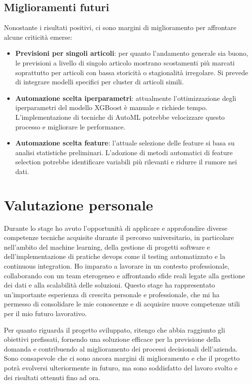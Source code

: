 \subsection{Miglioramenti futuri}
Nonostante i risultati positivi, ci sono margini di miglioramento per affrontare alcune criticità emerse:
\begin{itemize}
\item \textbf{Previsioni per singoli articoli}: per quanto l'andamento generale sia buono, le previsioni a livello di singolo articolo mostrano scostamenti più marcati soprattutto per articoli con bassa storicità o stagionalità irregolare. Si prevede di integrare modelli specifici per cluster di articoli simili.
    \item \textbf{Automazione scelta iperparametri}: attualmente l'ottimizzazione degli iperparametri del modello XGBoost è manuale e richiede tempo. L'implementazione di tecniche di AutoML potrebbe velocizzare questo processo e migliorare le performance.
    \item \textbf{Automazione scelta feature}: l'attuale selezione delle feature si basa su analisi statistiche preliminari. L'adozione di metodi automatici di feature selection potrebbe identificare variabili più rilevanti e ridurre il rumore nei dati.
\end{itemize}

\section{Valutazione personale}
Durante lo stage ho avuto l'opportunità di applicare e approfondire diverse competenze tecniche acquisite durante il percorso universitario, in particolare nell'ambito del machine learning, della gestione di progetti software e dell'implementazione di pratiche \gls{devops} come il testing automatizzato e la continuous integration. Ho imparato a lavorare in un contesto professionale, collaborando con un team eterogeneo e affrontando sfide reali legate alla gestione dei dati e alla scalabilità delle soluzioni. 
Questo stage ha rappresentato un'importante esperienza di crescita personale e professionale, che mi ha permesso di consolidare le mie conoscenze e di acquisire nuove competenze utili per il mio futuro lavorativo.

Per quanto riguarda il progetto sviluppato, ritengo che abbia raggiunto gli obiettivi prefissati, fornendo una soluzione efficace per la previsione della domanda e contribuendo al miglioramento dei processi decisionali dell'azienda.
Sono consapevole che ci sono ancora margini di miglioramento e che il progetto potrà evolversi ulteriormente in futuro, ma sono soddisfatto del lavoro svolto e dei risultati ottenuti fino ad ora.

\newpage
